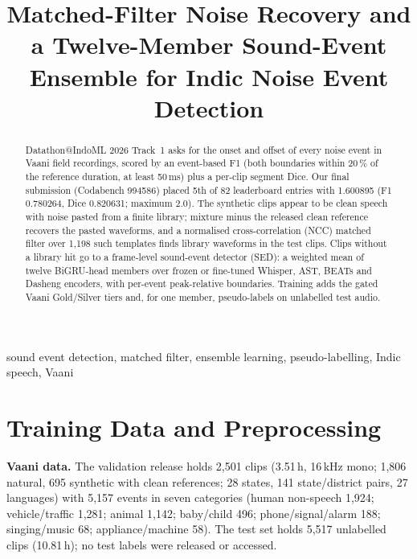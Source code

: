 \documentclass[conference]{IEEEtran}
\begin{document}
\title{Matched-Filter Noise Recovery and a Twelve-Member Sound-Event Ensemble for Indic Noise Event Detection}

\author{
}

\maketitle

\begin{abstract}
Datathon@IndoML 2026 Track~1 asks for the onset and offset of every noise event in Vaani field recordings, scored
by an event-based F1 (both boundaries within 20\,\% of the reference duration, at least 50\,ms) plus a per-clip
segment Dice. Our final submission (Codabench 994586) placed 5th of 82 leaderboard entries with 1.600895 (F1
0.780264, Dice 0.820631; maximum 2.0). The synthetic clips appear to be clean speech with noise pasted from a
finite library; mixture minus the released clean reference recovers the pasted waveforms, and a normalised
cross-correlation (NCC) matched filter over 1,198 such templates finds library waveforms in the test clips. Clips
without a library hit go to a frame-level sound-event detector (SED): a weighted mean of twelve BiGRU-head members
over frozen or fine-tuned Whisper, AST, BEATs and Dasheng encoders, with per-event peak-relative boundaries.
Training adds the gated Vaani Gold/Silver tiers and, for one member, pseudo-labels on unlabelled test audio.
\end{abstract}

\begin{IEEEkeywords}
sound event detection, matched filter, ensemble learning, pseudo-labelling, Indic speech, Vaani
\end{IEEEkeywords}

\section{Training Data and Preprocessing}
\textbf{Vaani data.} The validation release holds 2,501 clips (3.51\,h, 16\,kHz mono; 1,806 natural, 695 synthetic
with clean references; 28 states, 141 state/district pairs, 27 languages) with 5,157 events in seven categories
(human non-speech 1,924; vehicle/traffic 1,281; animal 1,142; baby/child 496; phone/signal/alarm 188;
singing/music 68; appliance/machine 58). The test set holds 5,517 unlabelled clips (10.81\,h); no test labels were
released or accessed.
\end{document}
